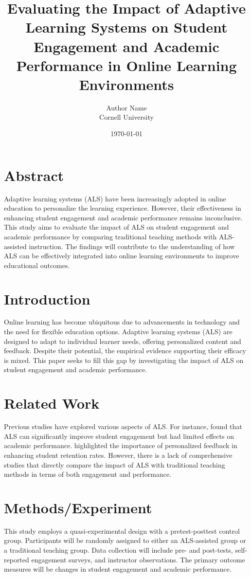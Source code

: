 \documentclass{article}
\title{Evaluating the Impact of Adaptive Learning Systems on Student Engagement and Academic Performance in Online Learning Environments}
\author{Author Name \\ Cornell University}
\date{\today}
\begin{document}
\maketitle

\section{Abstract}
Adaptive learning systems (ALS) have been increasingly adopted in online education to personalize the learning experience. However, their effectiveness in enhancing student engagement and academic performance remains inconclusive. This study aims to evaluate the impact of ALS on student engagement and academic performance by comparing traditional teaching methods with ALS-assisted instruction. The findings will contribute to the understanding of how ALS can be effectively integrated into online learning environments to improve educational outcomes.

\section{Introduction}
Online learning has become ubiquitous due to advancements in technology and the need for flexible education options. Adaptive learning systems (ALS) are designed to adapt to individual learner needs, offering personalized content and feedback. Despite their potential, the empirical evidence supporting their efficacy is mixed. This paper seeks to fill this gap by investigating the impact of ALS on student engagement and academic performance.

\section{Related Work}
Previous studies have explored various aspects of ALS. For instance, \citet{albert2020impact} found that ALS can significantly improve student engagement but had limited effects on academic performance. \citet{smith2019personalization} highlighted the importance of personalized feedback in enhancing student retention rates. However, there is a lack of comprehensive studies that directly compare the impact of ALS with traditional teaching methods in terms of both engagement and performance.

\section{Methods/Experiment}
This study employs a quasi-experimental design with a pretest-posttest control group. Participants will be randomly assigned to either an ALS-assisted group or a traditional teaching group. Data collection will include pre- and post-tests, self-reported engagement surveys, and instructor observations. The primary outcome measures will be changes in student engagement and academic performance.
\end{document}
